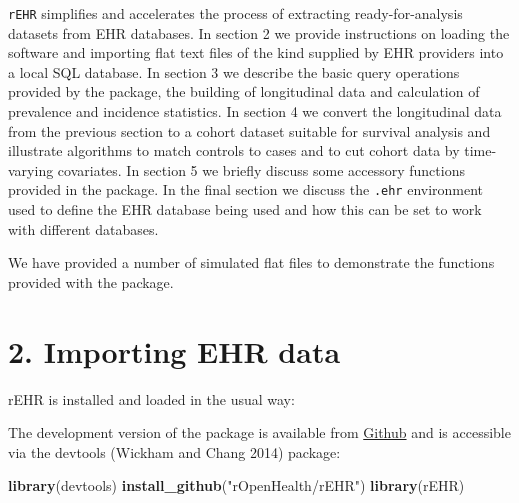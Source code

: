 \documentclass[]{article}
\newenvironment{Shaded}{\begin{snugshade}}{\end{snugshade}}
\newcommand{\KeywordTok}[1]{\textcolor[rgb]{0.13,0.29,0.53}{\textbf{{#1}}}}
\newcommand{\StringTok}[1]{\textcolor[rgb]{0.31,0.60,0.02}{{#1}}}
\newcommand{\NormalTok}[1]{{#1}}
\begin{document}
\texttt{rEHR} simplifies and accelerates the process of extracting
ready-for-analysis datasets from EHR databases. In section 2 we provide
instructions on loading the software and importing flat text files of
the kind supplied by EHR providers into a local SQL database. In section
3 we describe the basic query operations provided by the package, the
building of longitudinal data and calculation of prevalence and
incidence statistics. In section 4 we convert the longitudinal data from
the previous section to a cohort dataset suitable for survival analysis
and illustrate algorithms to match controls to cases and to cut cohort
data by time-varying covariates. In section 5 we briefly discuss some
accessory functions provided in the package. In the final section we
discuss the \texttt{.ehr} environment used to define the EHR database
being used and how this can be set to work with different databases.

We have provided a number of simulated flat files to demonstrate the
functions provided with the package.

\section{2. Importing EHR data}\label{importing-ehr-data}

rEHR is installed and loaded in the usual way:

\begin{Shaded}
\end{Shaded}

The development version of the package is available from
\href{http://www.github.com}{Github} and is accessible via the devtools
(Wickham and Chang 2014) package:

\begin{Shaded}
\begin{Highlighting}[]
\KeywordTok{library}\NormalTok{(devtools)}
\KeywordTok{install_github}\NormalTok{(}\StringTok{"rOpenHealth/rEHR"}\NormalTok{)}
\KeywordTok{library}\NormalTok{(rEHR)}
\end{Highlighting}
\end{Shaded}
\end{document}
